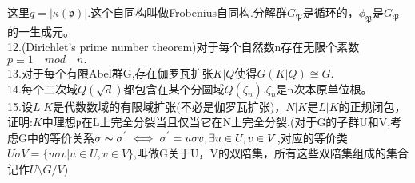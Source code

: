 \documentclass[UTF8]{article}
\begin{document}
    这里$q=|\kappa(\mathfrak{p})|.$这个自同构叫做Frobenius自同构.分解群$G_{\mathfrak{P}}$是循环的，$\phi_{\mathfrak{P}}$是$G_{\mathfrak{P}}$的一生成元。\\
    12.(Dirichlet's prime number theorem)对于每个自然数n存在无限个素数$p\equiv1\quad mod \quad n.$\\
    13.对于每个有限Abel群G,存在伽罗瓦扩张$K|Q$使得$G(K|Q)\cong G.$\\
    14.每个二次域$Q(\sqrt{d})$都包含在某个分圆域$Q(\zeta_{n}).$$\zeta_{n}$是n次本原单位根。\\
    15.设$L|K$是代数数域的有限域扩张(不必是伽罗瓦扩张)，$N|K$是$L|K$的正规闭包，证明:$K$中理想$\mathfrak{p}$在L上完全分裂当且仅当它在N上完全分裂.(对于G的子群U和V,考虑G中的等价关系$\sigma \thicksim \sigma^{'}\iff \sigma^{'}=u\sigma v,\exists u\in U,v\in V$,对应的等价类$U\sigma V=\{u\sigma v|u\in U,v\in V\}$,叫做G关于U，V的双陪集，所有这些双陪集组成的集合记作$U\setminus G/V$)\\
    
\end{document}
